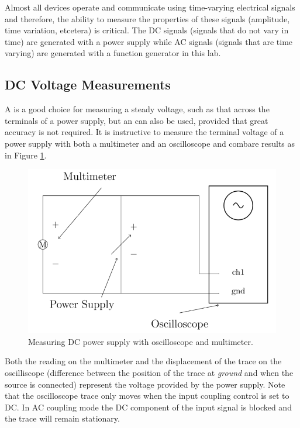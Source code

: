 Almost all devices operate and communicate using time-varying electrical signals and therefore, the ability to measure the properties of these signals (amplitude, time variation, etcetera) is critical. The DC signals (signals that do not vary in time) are generated with a power supply while AC signals (signals that are time varying) are generated with a function generator in this lab. 

\subsection{DC Voltage Measurements}

A  is a good choice for measuring a steady voltage, such as that across the terminals of a power supply, but an  can also be used, provided that great accuracy is not required. It is instructive to measure the terminal voltage of a power supply with both a multimeter and an oscilloscope and combare results as in Figure \ref{fig:ACDC2}.

\begin{figure}[H]
    \centering
    \includegraphics[scale = 0.8]{Images/ACDC1.PNG}
    \caption{Measuring DC power supply with oscilloscope and multimeter.}
    \label{fig:ACDC2}
\end{figure}

Both the reading on the multimeter and the displacement of the trace on the oscilliscope (difference between the position of the trace at \emph{ground} and when the source is connected) represent the voltage provided by the power supply. Note that the oscilloscope trace only moves when the input coupling control is set to DC. In AC coupling mode the DC component of the input signal is blocked and the trace will remain stationary. 

